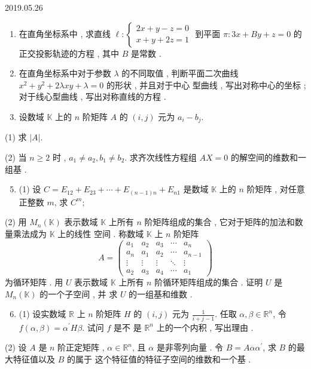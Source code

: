\documentclass[10pt]{article}
\begin{document}
   

2019.05.26

\begin{enumerate}
  \item  在直角坐标系中 ,  求直线  $\ell:\left\{\begin{array}{l}2 x+y-z=0 \\ x+y+2 z=1\end{array}\right.$  到平面  $\pi: 3 x+B y+z=0$  的正交投影轨迹的方程 ,  其中  $B$  是常数 .

  \item  在直角坐标系中对于参数  $\lambda$  的不同取值 ,  判断平面二次曲线  $x^{2}+y^{2}+2 \lambda x y+\lambda=0$  的形状 ,  并且对于中心   型曲线 ,  写出对称中心的坐标 ;  对于线心型曲线 ,  写出对称直线的方程 .

  \item  设数域  $\mathbb{K}$  上的  $n$  阶矩阵  $A$  的  $(i, j)$  元为  $a_{i}-b_{j}$.

\end{enumerate}
(1)  求  $|A|$.

(2)  当  $n \geqslant 2$  时 , $a_{1} \neq a_{2}, b_{1} \neq b_{2}$.  求齐次线性方程组  $A X=0$  的解空间的维数和一组基 .

\begin{enumerate}
  \setcounter{enumi}{4}
  \item (1)  设  $C=E_{12}+E_{23}+\cdots+E_{(n-1) n}+E_{n 1}$  是数域  $\mathbb{K}$  上的  $n$  阶矩阵 ,  对任意正整数  $m$,  求  $C^{m}$;
\end{enumerate}
(2)  用  $M_{n}(\mathbb{K})$  表示数域  $\mathbb{K}$  上所有  $n$  阶矩阵组成的集合 ,  它对于矩阵的加法和数量乘法成为  $\mathbb{K}$  上的线性   空间 .  称数域  $\mathbb{K}$  上  $n$  阶矩阵 
$$
A=\left(\begin{array}{ccccc}
a_{1} & a_{2} & a_{3} & \cdots & a_{n} \\
a_{n} & a_{1} & a_{2} & \cdots & a_{n-1} \\
\vdots & \vdots & \vdots & \ddots & \vdots \\
a_{2} & a_{3} & a_{4} & \cdots & a_{1}
\end{array}\right)
$$
 为循环矩阵 .  用  $U$  表示数域  $\mathbb{K}$  上所有  $n$  阶循环矩阵组成的集合 .  证明  $U$  是  $M_{n}(\mathbb{K})$  的一个子空间 ,  并   求  $U$  的一组基和维数 .

\begin{enumerate}
  \setcounter{enumi}{5}
  \item (1)  设实数域  $\mathbb{R}$  上  $n$  阶矩阵  $H$  的  $(i, j)$  元为  $\frac{1}{i+j-1}$.  任取  $\alpha, \beta \in \mathbb{R}^{n}$,  令  $f(\alpha, \beta)=\alpha^{\prime} H \beta$.  试问  $f$  是不   是  $\mathbb{R}^{n}$  上的一个内积 ,  写出理由 .
\end{enumerate}
(2)  设  $A$  是  $n$  阶正定矩阵 , $\alpha \in \mathbb{R}^{n}$,  且  $\alpha$  是非零列向量 .  令  $B=A \alpha \alpha^{\prime}$,  求  $B$  的最大特征值以及  $B$  的属于   这个特征值的特征子空间的维数和一个基 .
\end{document}

